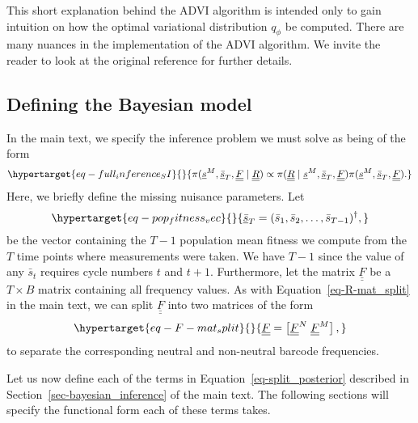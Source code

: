 \documentclass[
]{scrartcl}
\begin{document}
\begin{refsegment}
This short explanation behind the ADVI algorithm is intended only to
gain intuition on how the optimal variational distribution \(q_\phi\) be
computed. There are many nuances in the implementation of the ADVI
algorithm. We invite the reader to look at the original reference for
further details.

\hypertarget{sec-bayes_def}{%
\subsection{Defining the Bayesian model}\label{sec-bayes_def}}

In the main text, we specify the inference problem we must solve as
being of the form
\begin{equation}\protect\hypertarget{eq-full_inference_SI}{}{
\pi(
    \underline{s}^M, \underline{\bar{s}}_T, \underline{\underline{F}} \mid
    \underline{\underline{R}}
) \propto
\pi(
    \underline{\underline{R}} \mid
    \underline{s}^M, \underline{\bar{s}}_T, \underline{\underline{F}}
)
\pi(
    \underline{s}^M, \underline{\bar{s}}_T, \underline{\underline{F}}
).
}\label{eq-full_inference_SI}\end{equation} Here, we briefly define the
missing nuisance parameters. Let
\begin{equation}\protect\hypertarget{eq-pop_fitness_vec}{}{
\underline{\bar{s}}_T = (\bar{s}_1, \bar{s}_2, \ldots, \bar{s}_{T-1})^\dagger,
}\label{eq-pop_fitness_vec}\end{equation} be the vector containing the
\(T-1\) population mean fitness we compute from the \(T\) time points
where measurements were taken. We have \(T-1\) since the value of any
\(\bar{s}_t\) requires cycle numbers \(t\) and \(t+1\). Furthermore, let
the matrix \(\underline{\underline{F}}\) be a \(T \times B\) matrix
containing all frequency values. As with Equation~\ref{eq-R-mat_split}
in the main text, we can split \(\underline{\underline{F}}\) into two
matrices of the form
\begin{equation}\protect\hypertarget{eq-F-mat_split}{}{
\underline{\underline{F}} = \left[ 
\underline{\underline{F}}^N \; \underline{\underline{F}}^M
\right],
}\label{eq-F-mat_split}\end{equation} to separate the corresponding
neutral and non-neutral barcode frequencies.

Let us now define each of the terms in Equation~\ref{eq-split_posterior}
described in Section~\ref{sec-bayesian_inference} of the main text. The
following sections will specify the functional form each of these terms
takes.


\end{refsegment}
\end{document}
